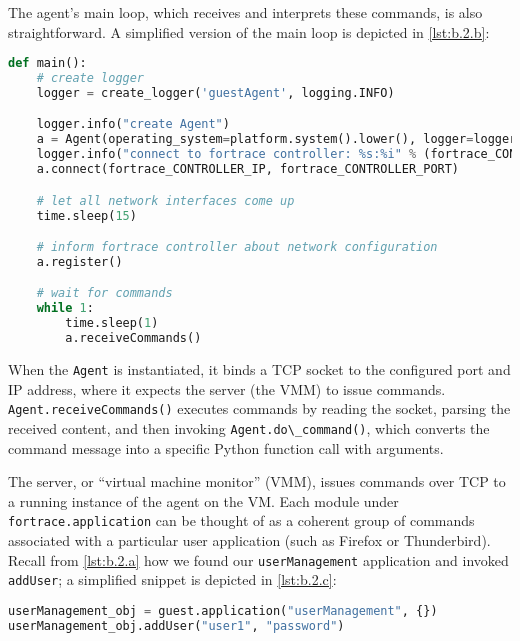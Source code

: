 The agent's main loop, which receives and interprets these commands, is
also straightforward. A simplified version of the main loop is depicted
in \autoref{lst:b.2.b}:

\begin{lstlisting}[label={lst:b.2.b}, caption={Simplified ForTrace agent entry point}, language=Python]
def main():
    # create logger
    logger = create_logger('guestAgent', logging.INFO)

    logger.info("create Agent")
    a = Agent(operating_system=platform.system().lower(), logger=logger)
    logger.info("connect to fortrace controller: %s:%i" % (fortrace_CONTROLLER_IP, fortrace_CONTROLLER_PORT))
    a.connect(fortrace_CONTROLLER_IP, fortrace_CONTROLLER_PORT)

    # let all network interfaces come up
    time.sleep(15)

    # inform fortrace controller about network configuration
    a.register()

    # wait for commands
    while 1:
        time.sleep(1)
        a.receiveCommands()
\end{lstlisting}

When the \passthrough{\lstinline!Agent!} is instantiated, it binds a TCP
socket to the configured port and IP address, where it expects the
server (the VMM) to issue commands.
\passthrough{\lstinline!Agent.receiveCommands()!} executes commands by
reading the socket, parsing the received content, and then invoking
\passthrough{\lstinline!Agent.do\_command()!}, which converts the
command message into a specific Python function call with arguments.

The server, or ``virtual machine monitor'' (VMM), issues commands over
TCP to a running instance of the agent on the VM. Each module under
\passthrough{\lstinline!fortrace.application!} can be thought of as a
coherent group of commands associated with a particular user application
(such as Firefox or Thunderbird). Recall from \autoref{lst:b.2.a} how we
found our \passthrough{\lstinline!userManagement!} application and
invoked \passthrough{\lstinline!addUser!}; a simplified snippet is
depicted in \autoref{lst:b.2.c}:

\begin{lstlisting}[label={lst:b.2.c}, caption={Minimal ForTrace application API usage}, language=Python]
userManagement_obj = guest.application("userManagement", {})
userManagement_obj.addUser("user1", "password")
\end{lstlisting}

